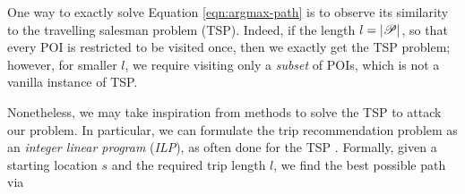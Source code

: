 



One way to exactly solve Equation \ref{eqn:argmax-path}
is to observe its similarity to the travelling salesman problem (TSP).
Indeed, if the length $l = |\mathscr{P}|$, so that every POI is restricted to be visited once,
then we exactly get the TSP problem;
however, for smaller $l$, we require visiting only a \emph{subset} of POIs,
which is not a vanilla instance of TSP.

Nonetheless, we may take inspiration from methods to solve the TSP to attack our problem.
In particular, 
we can formulate the trip recommendation problem as an \emph{integer linear program} (\emph{ILP}),
as often done for the TSP \citep{opt98}.
Formally, given a starting location $s$ and the required trip length $l$,
we find the best possible path
via \citep{Chen:2017}


